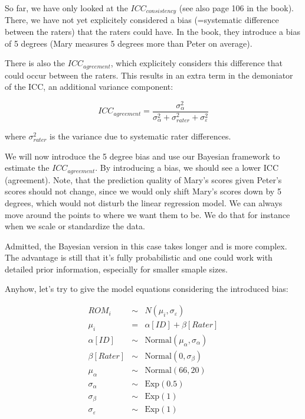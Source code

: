 \documentclass[
]{book}
\begin{document}
So far, we have only looked at the \textbf{\(ICC_{consistency}\)} (see also page 106 in the book).
There, we have not yet explicitely considered a bias (=systematic difference
between the raters) that the raters could have. In the book,
they introduce a bias of 5 degrees (Mary measures 5 degrees more than Peter on average).

There is also the \textbf{\(ICC_{agreement}\)}, which explicitely considers this difference
that could occur between the raters. This results in an extra term in the demoniator
of the ICC, an additional variance component:

\[ ICC_{agreement} = \frac{\sigma_{\alpha}^2}{\sigma_{\alpha}^2 + 
\sigma_{rater}^2 + \sigma_{\varepsilon}^2}\]

where \(\sigma_{rater}^2\) is the variance due to systematic rater differences.

We will now introduce the 5 degree bias and use our Bayesian
framework to estimate the \(ICC_{agreement}\).
By introducing a bias, we should see
a lower ICC (agreement). Note, that the prediction quality of Mary's scores
given Peter's scores should not change, since we would only shift Mary's scores
down by 5 degrees, which would not disturb the linear regression model. We can
always move around the points to where we want them to be. We do that for instance
when we scale or standardize the data.

Admitted, the Bayesian version in this case takes longer and is more complex.
The advantage is still that it's fully probabilistic and one could work with
detailed prior information, especially for smaller smaple sizes.

Anyhow, let's try to give the model equations considering
the introduced bias:

\[
\begin{array}{rcl}
ROM_i &\sim& N(\mu_i, \sigma_{\varepsilon}) \\
\mu_i &=& \alpha[ID] + \beta[Rater] \\
\alpha[ID] &\sim& \text{Normal}(\mu_{\alpha}, \sigma_{\alpha}) \\
\beta[Rater] &\sim& \text{Normal}(0, \sigma_{\beta}) \\
\mu_{\alpha} &\sim& \text{Normal}(66, 20) \\
\sigma_{\alpha} &\sim& \text{Exp}(0.5) \\
\sigma_{\beta} &\sim& \text{Exp}(1) \\
\sigma_{\varepsilon} &\sim& \text{Exp}(1)
\end{array}
\]
\end{document}

